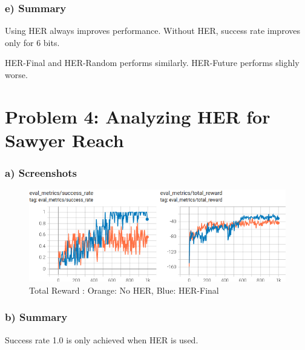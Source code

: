 \documentclass[12pt]{article}
\begin{document}
\newpage
\subsubsection*{e) Summary}

Using HER always improves performance. Without HER, success rate improves only for 6 bits.

HER-Final and HER-Random performs similarly. HER-Future performs slighly worse.

\newpage
\section*{Problem 4: Analyzing HER for Sawyer Reach}


\subsubsection*{a) Screenshots}

\begin{figure}[h!]
\centering
\includegraphics[width=1.0\linewidth]{figures/q4-a}
\vspace{-3mm}
\caption{Total Reward : Orange: No HER, Blue: HER-Final }
\label{fig:q4a}
\end{figure}

\subsubsection*{b) Summary}

    Success rate 1.0 is only achieved when HER is used.
\end{document}
